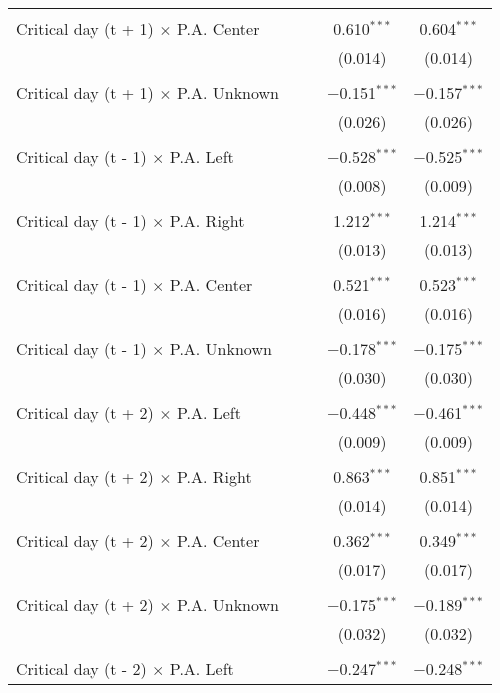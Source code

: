 \documentclass[
]{article}
\begin{document}
\begin{table}[!htbp]
{\begin{tabular}{@{\extracolsep{5pt}}lcccc}
  & & & & \\ 
 Critical day (t + 1) $\times$ P.A. Center &  &  & 0.610$^{***}$ & 0.604$^{***}$ \\ 
  &  &  & (0.014) & (0.014) \\ 
  & & & & \\ 
 Critical day (t + 1) $\times$ P.A. Unknown &  &  & $-$0.151$^{***}$ & $-$0.157$^{***}$ \\ 
  &  &  & (0.026) & (0.026) \\ 
  & & & & \\ 
 Critical day (t - 1) $\times$ P.A. Left &  &  & $-$0.528$^{***}$ & $-$0.525$^{***}$ \\ 
  &  &  & (0.008) & (0.009) \\ 
  & & & & \\ 
 Critical day (t - 1) $\times$ P.A. Right &  &  & 1.212$^{***}$ & 1.214$^{***}$ \\ 
  &  &  & (0.013) & (0.013) \\ 
  & & & & \\ 
 Critical day (t - 1) $\times$ P.A. Center &  &  & 0.521$^{***}$ & 0.523$^{***}$ \\ 
  &  &  & (0.016) & (0.016) \\ 
  & & & & \\ 
 Critical day (t - 1) $\times$ P.A. Unknown &  &  & $-$0.178$^{***}$ & $-$0.175$^{***}$ \\ 
  &  &  & (0.030) & (0.030) \\ 
  & & & & \\ 
 Critical day (t + 2) $\times$ P.A. Left &  &  & $-$0.448$^{***}$ & $-$0.461$^{***}$ \\ 
  &  &  & (0.009) & (0.009) \\ 
  & & & & \\ 
 Critical day (t + 2) $\times$ P.A. Right &  &  & 0.863$^{***}$ & 0.851$^{***}$ \\ 
  &  &  & (0.014) & (0.014) \\ 
  & & & & \\ 
 Critical day (t + 2) $\times$ P.A. Center &  &  & 0.362$^{***}$ & 0.349$^{***}$ \\ 
  &  &  & (0.017) & (0.017) \\ 
  & & & & \\ 
 Critical day (t + 2) $\times$ P.A. Unknown &  &  & $-$0.175$^{***}$ & $-$0.189$^{***}$ \\ 
  &  &  & (0.032) & (0.032) \\ 
  & & & & \\ 
 Critical day (t - 2) $\times$ P.A. Left &  &  & $-$0.247$^{***}$ & $-$0.248$^{***}$ \\ 

\end{tabular}}
\end{table}
\end{document}
